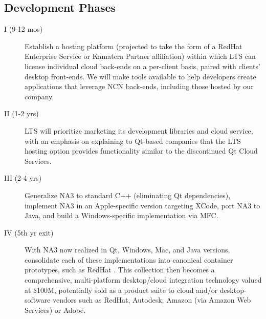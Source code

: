 
\begin{frame}{}
\section{Development Phases}


\vspace{-.8em}



\hspace{20pt}\begin{minipage}{.996\textwidth}
{\fontsize{17}{23}\selectfont{}\selectfont \setlength{\leftmargini}{3pt}\begin{description}
\item[I (9-12 mos)] Establish a hosting platform 
(projected to take the form of a 
RedHat Enterprise Service or Kamatera Partner affiliation) within which 
LTS can license individual cloud back-ends 
on a per-client basis, paired with 
clients' desktop front-ends.  We will make tools 
available to help developers create applications 
that leverage NCN back-ends, including those hosted by 
our company.
\vspace{12pt}
\item[II (1-2 yrs)]  
LTS will prioritize marketing its development libraries 
and cloud service, 
with an emphasis on explaining to Qt-based 
companies that the LTS hosting option provides 
functionality similar to the discontinued 
Qt Cloud Services.   
\vspace{12pt}
\item[III (2-4 yrs)] Generalize NA3 to standard 
C++ (eliminating Qt dependencies),   
implement NA3 in an Apple-specific version 
targeting XCode, port NA3 to Java, and 
build a Windows-specific implementation 
via MFC.
\vspace{12pt}
\item[IV (5th yr exit)] With NA3 now realized 
in Qt, Windows, Mac, and Java versions, 
consolidate each of these implementations 
into canonical container prototypes, 
such as RedHat .  This 
collection then becomes 
a comprehensive, multi-platform 
desktop/cloud integration technology 
valued at \$100M, potentially sold as a 
product suite to cloud and/or 
desktop-software vendors such as  
RedHat, Autodesk, Amazon 
(via Amazon Web Services) or Adobe.
\end{description}}\end{minipage}


\end{frame}
